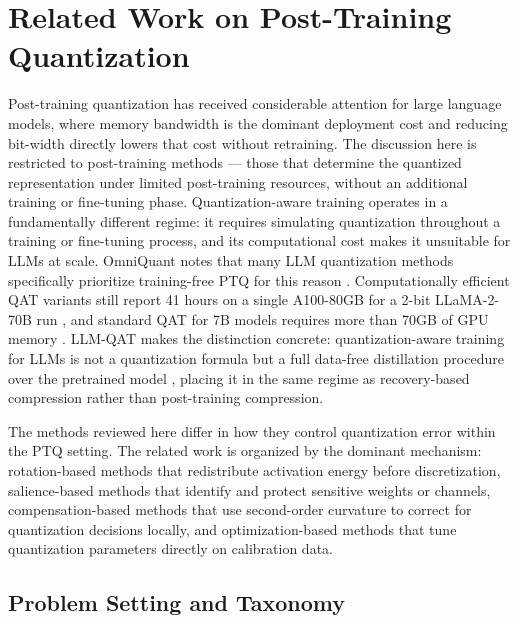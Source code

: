 
\providecommand{\methoddetail}[1]{%
  \par\medskip
  \noindent{\bfseries #1}\par
  \smallskip\noindent
}

\section{Related Work on Post-Training Quantization}

Post-training quantization has received considerable attention for large language models, where memory bandwidth is the dominant deployment cost and reducing bit-width directly lowers that cost without retraining. The discussion here is restricted to post-training methods — those that determine the quantized representation under limited post-training resources, without an additional training or fine-tuning phase. Quantization-aware training operates in a fundamentally different regime: it requires simulating quantization throughout a training or fine-tuning process, and its computational cost makes it unsuitable for LLMs at scale. OmniQuant notes that many LLM quantization methods specifically prioritize training-free PTQ for this reason \cite{shao2024omniquant}. Computationally efficient QAT variants still report 41 hours on a single A100-80GB for a 2-bit LLaMA-2-70B run \cite{tang2024efficientqat}, and standard QAT for 7B models requires more than 70GB of GPU memory \cite{bondarenko2024lrqat}. LLM-QAT makes the distinction concrete: quantization-aware training for LLMs is not a quantization formula but a full data-free distillation procedure over the pretrained model \cite{liu2023llm}, placing it in the same regime as recovery-based compression rather than post-training compression.

The methods reviewed here differ in how they control quantization error within the PTQ setting. The related work is organized by the dominant mechanism: rotation-based methods that redistribute activation energy before discretization, salience-based methods that identify and protect sensitive weights or channels, compensation-based methods that use second-order curvature to correct for quantization decisions locally, and optimization-based methods that tune quantization parameters directly on calibration data.

\subsection{Problem Setting and Taxonomy}

